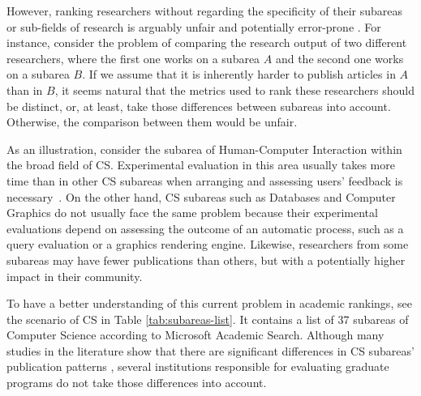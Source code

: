 \documentclass[msc]{ppgccufmg}
\begin{document}
However, ranking researchers without regarding the specificity of their subareas or sub-fields of research is arguably unfair and potentially error-prone \citep{lima2013jcdl}. For instance, consider the problem of comparing the research output of two different researchers, where the first one works on a subarea $A$ and the second one works on a subarea $B$. If we assume that it is inherently harder to publish articles in $A$ than in $B$, it seems natural that the metrics used to rank these researchers should be distinct, or, at least, take those differences between subareas into account. Otherwise, the comparison between them would be unfair.

As an illustration, consider the subarea of Human-Computer Interaction within the broad field of CS. Experimental evaluation in this area usually takes more time than in other CS subareas when arranging and assessing users' feedback is necessary~\citep{wainer13}.
%
On the other hand, CS subareas such as Databases and Computer Graphics do not usually face the same problem because their experimental evaluations depend on assessing the outcome of an automatic process, such as a query evaluation or a graphics rendering engine. Likewise, researchers from some subareas may have fewer publications than others, but with a potentially higher impact in their community. 

To have a better understanding of this current problem in academic rankings, see the scenario of CS in Table \ref{tab:subareas-list}.  It contains a list of 37 subareas of Computer Science according to Microsoft Academic Search. Although many studies in the literature show that there are significant differences in CS subareas' publication patterns \citep{hoonlor13,lima15,wainer13}, several institutions responsible for evaluating graduate programs do not take those differences into account. 
\end{document}
